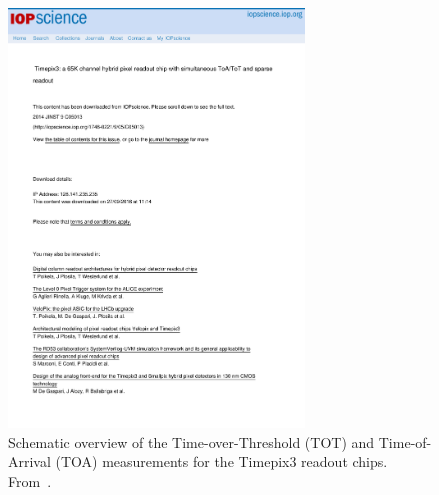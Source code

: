 \begin{figure}[htbp]
  \centering
  \includegraphics[width=0.7\textwidth, page=8, trim = 50mm 190mm 60mm
  30mm, clip]{Articles/Timepix3_JINST.pdf}
  \caption{Schematic overview of the Time-over-Threshold (TOT) and
    Time-of-Arrival (TOA) measurements for the Timepix3 readout
    chips. From~\cite{Timepix3Poikela}.}
  \label{fig:TOT_TOA_concept}
\end{figure}





